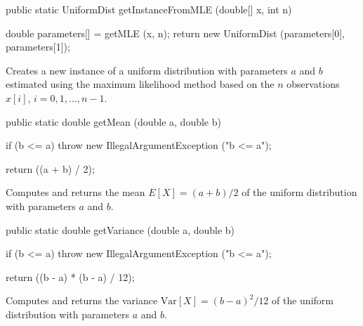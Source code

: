 \begin{htmlonly}
\end{htmlonly}
\begin{code}
   
   public static UniformDist getInstanceFromMLE (double[] x, int n)\begin{hide} {
      double parameters[] = getMLE (x, n);
      return new UniformDist (parameters[0], parameters[1]);
   }\end{hide}
\end{code}
\begin{tabb}
   Creates a new instance of a uniform distribution with parameters $a$ and $b$
   estimated using the maximum likelihood method based on the $n$ observations
   $x[i]$, $i = 0, 1, \ldots, n-1$.
\end{tabb}
\begin{htmlonly}
\end{htmlonly}
\begin{code}

   public static double getMean (double a, double b)\begin{hide} {
      if (b <= a)
         throw new IllegalArgumentException ("b <= a");

      return ((a + b) / 2);
   }\end{hide}
\end{code}
\begin{tabb}  Computes and returns the mean $E[X] = (a + b)/2$
   of the uniform distribution with parameters $a$ and $b$.
\end{tabb}
\begin{htmlonly}
\end{htmlonly}
\begin{code}

   public static double getVariance (double a, double b)\begin{hide} {
      if (b <= a)
         throw new IllegalArgumentException ("b <= a");

      return ((b - a) * (b - a) / 12);
   }\end{hide}
\end{code}
\begin{tabb}  Computes and returns the variance $\mbox{Var}[X] = (b - a)^2/12$
   of the uniform distribution with parameters $a$ and $b$.
\end{tabb}
